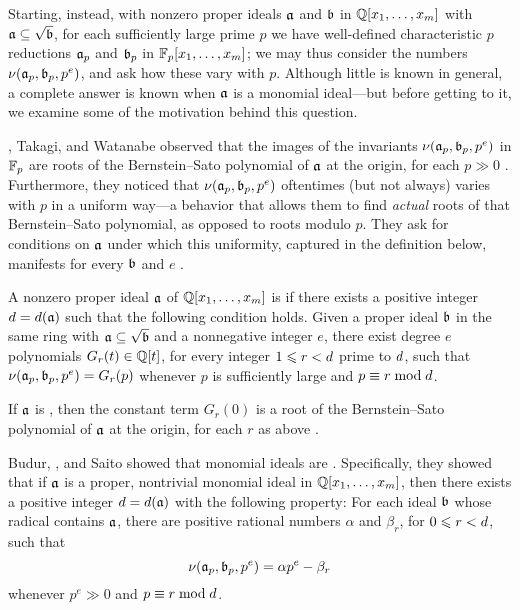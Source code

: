 \documentclass{amsart}
\begin{document}
Starting, instead, with nonzero proper ideals $\mathfrak{a}$ and $\mathfrak{b}$ in $\mathbb{Q}[x_1,\ldots,x_m]$ with $\mathfrak{a} \subseteq \sqrt {\mathfrak{b}}$, for each sufficiently large prime $p$ we have well-defined characteristic $p$ reductions $\mathfrak{a}_p$ and $\mathfrak{b}_p$ in $\mathbb{F}_p[x_1,\ldots,x_m]$; we may thus consider the numbers $\nu(\mathfrak{a}_p,\mathfrak{b}_p,p^e)$, and ask how these vary with $p$.
Although little is known in general, a complete answer is known when $\mathfrak{a}$ is a monomial ideal---but before getting to it, we examine some of the motivation behind this question.

\mustata, Takagi, and Watanabe observed that the images of the invariants $\nu(\mathfrak{a}_p,\mathfrak{b}_p,p^e)$ in $\mathbb{F}_p$ are roots of the Bernstein--Sato polynomial of $\mathfrak{a}$ at the origin, for each $p \gg 0$ \cite[Proposition~3.11]{mustata+takagi+watanabe.F-thresholds}.
Furthermore, they noticed that $\nu(\mathfrak{a}_p,\mathfrak{b}_p,p^e)$ oftentimes (but not always) varies with $p$ in a uniform way---a behavior that allows them to find \emph{actual} roots of that Bernstein--Sato polynomial, as opposed to roots modulo $p$.
They ask for conditions on $\mathfrak{a}$ under which this uniformity, captured in the definition below, manifests for every $\mathfrak{b}$ and $e$ \cite[Problem~3.8]{mustata+takagi+watanabe.F-thresholds}.

\begin{definition}
   \label{defn: nuCool}
   A nonzero proper ideal $\mathfrak{a}$ of $\mathbb{Q}[x_1,\ldots,x_m]$ is \emph{\nuCool} if there exists a positive integer $d = d(\mathfrak{a})$ such that the following condition holds.
   Given a proper ideal $\mathfrak{b}$ in the same ring with $\mathfrak{a} \subseteq \sqrt {\mathfrak{b}}$ and a nonnegative integer $e$, there exist degree $e$ polynomials $G_r(t) \in \mathbb{Q}[t]$, for every integer $1 \leqslant r < d$ prime to $d$, such that $\nu(\mathfrak{a}_p, \mathfrak{b}_p, p^e) = G_r(p)$ whenever $p$ is sufficiently large and $p \equiv r \bmod d$.
\end{definition}

If $\mathfrak{a}$ is \nuCool, then the constant term $G_r(0)$ is a root of the Bernstein--Sato polynomial of $\mathfrak{a}$ at the origin, for each $r$ as above \cite[Remark~3.13]{mustata+takagi+watanabe.F-thresholds}.

\smallskip

Budur, \mustata, and Saito showed that monomial ideals are \nuCool \cite[Theorem~4.1]{budur+mustata+saito.roots_bs_polys_monomial}.
Specifically, they showed that if $\mathfrak{a}$ is a proper, nontrivial monomial ideal in $\mathbb{Q}[x_1,\ldots,x_m]$, then there exists a positive integer $d = d(\mathfrak{a})$ with the following property:
For each ideal $\mathfrak{b}$ whose radical contains $\mathfrak{a}$, there are positive rational numbers $\alpha$ and $\beta_r$, for $0 \leqslant r < d$, such that
\begin{equation}
   \label{eq: nu-uniformity for monomial ideals}
   \nu(\mathfrak{a}_p, \mathfrak{b}_p, p^e) = \alpha p^e - \beta_r
\end{equation}
whenever $p^e \gg 0$ and $p \equiv r \bmod d$.
\end{document}
